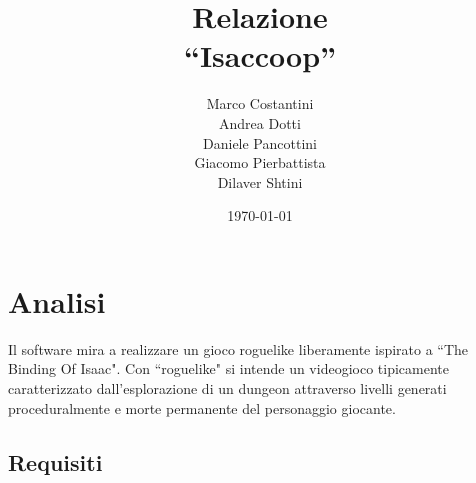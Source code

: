 \documentclass[a4paper,12pt]{report}
\title{Relazione\\``Isaccoop''}
\author{Marco Costantini\\Andrea Dotti\\Daniele Pancottini\\Giacomo Pierbattista\\Dilaver Shtini}
\date{\today}
\begin{document}
\maketitle

\tableofcontents

\chapter{Analisi}
Il software mira a realizzare un gioco roguelike liberamente ispirato a ``The Binding Of Isaac". Con ``roguelike" si intende un videogioco tipicamente caratterizzato dall'esplorazione di un dungeon attraverso livelli generati proceduralmente e morte permanente del personaggio giocante.

\section{Requisiti}
\end{document}
